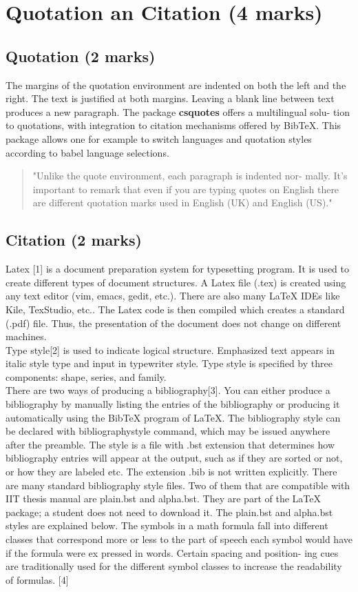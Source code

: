\documentclass[]{article}
\begin{document}
\section{Quotation an Citation (4 marks)}
\subsection{Quotation (2 marks)}
The margins of the quotation environment are indented on both the left and the
right. The text is justified at both margins. Leaving a blank line between text
produces a new paragraph. The package \textbf{csquotes} offers a multilingual solu-
tion to quotations, with integration to citation mechanisms offered by BibTeX.
This package allows one for example to switch languages and quotation styles
according to babel language selections.

\begin{quote}
"Unlike the quote environment, each paragraph is indented nor- mally.
It’s important to remark that even if you are typing quotes on English
there are different quotation marks used in English (UK) and English
(US)."
\end{quote}

\subsection{Citation (2 marks)}
Latex [1] is a document preparation system for typesetting program. It is used
to create different types of document structures. A Latex file (.tex) is created
using any text editor (vim, emacs, gedit, etc.). There are also many LaTeX
IDEs like Kile, TexStudio, etc.. The Latex code is then compiled which creates
a standard (.pdf) file. Thus, the presentation of the document does not change
on different machines.
\\
Type style[2] is used to indicate logical structure. Emphasized text appears in
italic style type and input in typewriter style. Type style is specified by three
components: shape, series, and family.\\

There are two ways of producing a bibliography[3]. You can either produce
a bibliography by manually listing the entries of the bibliography or producing
it automatically using the BibTeX program of LaTeX. The bibliography style can
be declared with bibliographystyle command, which may be issued anywhere
after the preamble. The style is a file with .bst extension that determines how
bibliography entries will appear at the output, such as if they are sorted or not,
or how they are labeled etc. The extension .bib is not written explicitly. There
are many standard bibliography style files. Two of them that are compatible
with IIT thesis manual are plain.bst and alpha.bst. They are part of the LaTeX
package; a student does not need to download it. The plain.bst and alpha.bst
styles are explained below. The symbols in a math formula fall into different
classes that correspond more or less to the part of speech each symbol would
have if the formula were ex pressed in words. Certain spacing and position-
ing cues are traditionally used for the different symbol classes to increase the
readability of formulas. [4]
\end{document}
